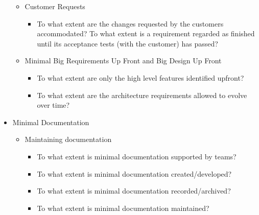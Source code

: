 \begin{appendices}
\begin{itemize}
\begin{itemize}
\begin{itemize}
				\end{itemize}
			\item Customer Requests
				\begin{itemize}
					\item To what extent are the changes requested by the customers accommodated?
					\addition To what extent is a requirement regarded as finished until its acceptance tests (with the customer) has passed?
				\end{itemize}
			\item Minimal Big Requirements Up Front and Big Design Up Front
				\begin{itemize}
					\item To what extent are only the high level features identified upfront?
					\item To what extent are the architecture requirements allowed to evolve over time?
				\end{itemize}
		\end{itemize}
	\item Minimal Documentation
		\begin{itemize}
			\item Maintaining documentation 
				\begin{itemize}
					\item To what extent is minimal documentation supported by teams?
					\item To what extent is minimal documentation created/developed?
					\item To what extent is minimal documentation recorded/archived?
					\item To what extent is minimal documentation maintained?
				\end{itemize}
		\end{itemize}
\end{itemize}

\end{appendices}

